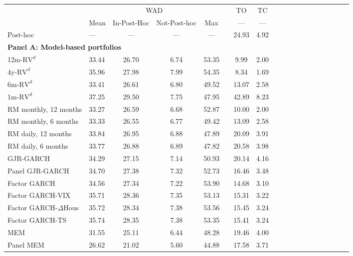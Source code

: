 \begin{tabular}{lllccclccccccccccccc} 
\toprule 
 & & \multicolumn{4}{c}{WAD} & & \multicolumn{1}{c}{TO} & \multicolumn{1}{c}{TC}\\\cmidrule{3-6} \cmidrule{8-9} 
 & & Mean & In-Post-Hoc & Not-Post-hoc & Max & & --- & --- \\\midrule 
\multicolumn{2}{l}{Post-hoc} & --- & --- & --- & --- & & 24.93 & 4.92 \\ \midrule\multicolumn{5}{l}{\textbf{Panel A: Model-based portfolios}}\\ \midrule 
\multicolumn{2}{l}{12m-$\text{RV}^d$} & 33.44 & 26.70 & 6.74 & 53.35 & & 9.99 & 2.00\\ 
\multicolumn{2}{l}{4y-$\text{RV}^d$} & 35.96 & 27.98 & 7.99 & 54.35 & & 8.34 & 1.69\\ 
\multicolumn{2}{l}{6m-$\text{RV}^d$} & 33.41 & 26.61 & 6.80 & 49.52 & & 13.07 & 2.58\\ 
\multicolumn{2}{l}{1m-$\text{RV}^d$} & 37.25 & 29.50 & 7.75 & 47.95 & & 42.89 & 8.23\\ 
\midrule 
\multicolumn{2}{l}{RM monthly, 12 months} & 33.27 & 26.59 & 6.68 & 52.87 & & 10.00 & 2.00\\ 
\multicolumn{2}{l}{RM monthly, 6 months} & 33.33 & 26.55 & 6.77 & 49.42 & & 13.09 & 2.58\\ 
\multicolumn{2}{l}{RM daily, 12 months} & 33.84 & 26.95 & 6.88 & 47.89 & & 20.09 & 3.91\\ 
\multicolumn{2}{l}{RM daily, 6 months} & 33.77 & 26.88 & 6.89 & 47.82 & & 20.58 & 3.98\\ 
\midrule 
\multicolumn{2}{l}{GJR-GARCH} & 34.29 & 27.15 & 7.14 & 50.93 & & 20.14 & 4.16\\ 
\multicolumn{2}{l}{Panel GJR-GARCH} & 34.70 & 27.38 & 7.32 & 52.73 & & 16.46 & 3.48\\ 
\multicolumn{2}{l}{Factor GARCH} & 34.56 & 27.34 & 7.22 & 53.90 & & 14.68 & 3.10\\ 
\multicolumn{2}{l}{Factor GARCH-VIX} & 35.71 & 28.36 & 7.35 & 53.13 & & 15.31 & 3.22\\ 
\multicolumn{2}{l}{Factor GARCH-$\Delta$Hous} & 35.72 & 28.34 & 7.38 & 53.56 & & 15.45 & 3.24\\ 
\multicolumn{2}{l}{Factor GARCH-TS} & 35.74 & 28.35 & 7.38 & 53.35 & & 15.41 & 3.24\\ 
\multicolumn{2}{l}{MEM} & 31.55 & 25.11 & 6.44 & 48.28 & & 19.46 & 4.00\\ 
\multicolumn{2}{l}{Panel MEM} & 26.62 & 21.02 & 5.60 & 44.88 & & 17.58 & 3.71\\ 

\end{tabular}
